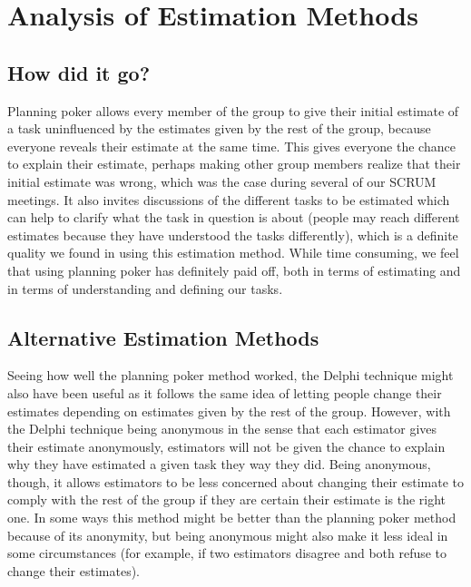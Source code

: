 \section{Analysis of Estimation Methods}
\label{sec:AnalysisEstimation}
\subsection{How did it go?}
Planning poker allows every member of the group to give their initial estimate of a task uninfluenced by the estimates given by the rest of the group, because everyone reveals their estimate at the same time. This gives everyone the chance to explain their estimate, perhaps making other group members realize that their initial estimate was wrong, which was the case during several of our SCRUM meetings. It also invites discussions of the different tasks to be estimated which can help to clarify what the task in question is about (people may reach different estimates because they have understood the tasks differently), which is a definite quality we found in using this estimation method. While time consuming, we feel that using planning poker has definitely paid off, both in terms of estimating and in terms of understanding and defining our tasks.

\subsection{Alternative Estimation Methods}
Seeing how well the planning poker method worked, the Delphi technique \cite{caye} might also have been useful as it follows the same idea of letting people change their estimates depending on estimates given by the rest of the group. However, with the Delphi technique being anonymous in the sense that each estimator gives their estimate anonymously, estimators will not be given the chance to explain why they have estimated a given task they way they did. Being anonymous, though, it allows estimators to be less concerned about changing their estimate to comply with the rest of the group if they are certain their estimate is the right one. In some ways this method might be better than the planning poker method because of its anonymity, but being anonymous might also make it less ideal in some circumstances (for example, if two estimators disagree and both refuse to change their estimates).

